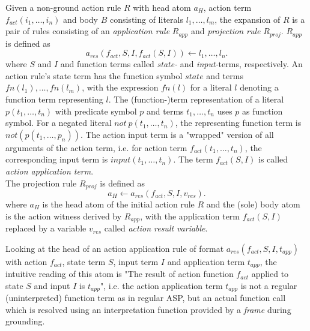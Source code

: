 \begin{definition}
\label{def:action-rule-expansion}
Given a non-ground action rule $R$ with head atom $a_H$, action term $f_{act}(i_1,\ldots,i_n)$ and body  $B$ consisting of literals $l_1,\ldots,l_m$, the expansion of $R$ is a pair of rules consisting of an \emph{application rule} $R_{app}$ and \emph{projection rule} $R_{proj}$. $R_{app}$ is defined as
\[
	a_{res}(f_{act}, S, I, f_{act}(S, I)) \leftarrow l_1,\ldots,l_n.
\]
where $S$ and $I$ and function terms called \emph{state-} and \emph{input-}terms, respectively.
An action rule's state term has the function symbol $\mathit{state}$ and terms $fn(l_1),\ldots,fn(l_m)$, with the expression $fn(l)$ for a literal $l$ denoting a function term representing $l$. The (function-)term representation of a literal $p(t_1,\ldots,t_n)$ with predicate symbol $p$ and terms $t_1,\ldots,t_n$ uses $p$ as function symbol. For a negated literal $\mathit{not}~p(t_1,\ldots,t_n)$, the representing function term is $not(p(t_1,\ldots,p_n))$. The action input term is a "wrapped" version of all arguments of the action term, i.e. for action term $f_{act}(t_1,\ldots,t_n)$, the corresponding input term is $input(t_1,\ldots,t_n)$. The term $f_{act}(S, I)$ is called \emph{action application term}. \\
The projection rule $R_{proj}$ is defined as
\[
	a_H \leftarrow a_{res}(f_{act}, S, I, v_{res}).
\]
where $a_H$ is the head atom of the initial action rule $R$ and the (sole) body atom is the action witness derived by $R_{app}$, with the application term $f_{act}(S, I)$ replaced by a variable $v_{res}$ called \emph{action result variable}.
\end{definition}

Looking at the head of an action application rule of format $a_{res}(f_{act}, S, I, \mathit{t_{app}})$ with action $f_{act}$, state term $S$, input term $I$ and application term $t_{app}$, the intuitive reading of this atom is "The result of action function $f_{act}$ applied to state $S$ and input $I$ is $t_{app}$", i.e. the action application term $t_{app}$ is not a regular (uninterpreted) function term as in regular ASP, but an actual function call which is resolved using an interpretation function provided by a \emph{frame} during grounding.


